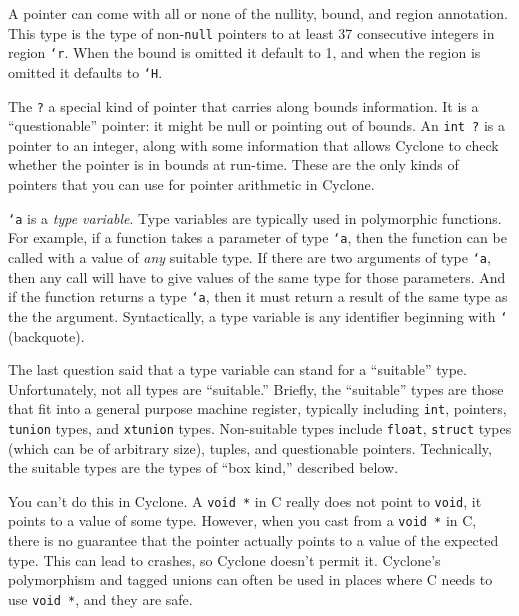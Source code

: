 
A pointer can come with all or none of the nullity, bound, and region
annotation.  This type is the type of non-\texttt{null} pointers to
at least 37 consecutive integers in region \texttt{`r}.  When the
bound is omitted it default to 1, and when the region is omitted
it defaults to \texttt{`H}.


The \texttt{?} a special kind of pointer that carries along bounds
information.  It is a ``questionable'' pointer: it might be null or
pointing out of bounds.  An \texttt{int ?} is a pointer to an integer,
along with some information that allows Cyclone to check whether the
pointer is in bounds at run-time.  These are the only kinds of
pointers that you can use for pointer arithmetic in Cyclone.


\texttt{`a} is a \emph{type variable}.  Type variables are typically
used in polymorphic functions.  For example, if a function takes a
parameter of type \texttt{`a}, then the function can be called with a
value of \emph{any} suitable type.  If there are two arguments of type
\texttt{`a}, then any call will have to give values of the same type
for those parameters.  And if the function returns a type \texttt{`a},
then it must return a result of the same type as the the argument.
Syntactically, a type variable is any identifier beginning with
\texttt{`} (backquote).


The last question said that a type variable can stand for a
``suitable'' type.  Unfortunately, not all types are ``suitable.''
Briefly, the ``suitable'' types are those that fit into a general
purpose machine register, typically including \texttt{int}, pointers,
\texttt{tunion} types, and \texttt{xtunion} types.  Non-suitable types
include \texttt{float}, \texttt{struct} types (which can be of
arbitrary size), tuples, and questionable pointers.
Technically, the suitable types are the types of ``box kind,''
described below.


You can't do this in Cyclone.  A \texttt{void *} in C really does not
point to \texttt{void}, it points to a value of some type.  However,
when you cast from a \texttt{void *} in C, there is no guarantee that
the pointer actually points to a value of the expected type.  This can
lead to crashes, so Cyclone doesn't permit it.  Cyclone's
polymorphism and tagged unions can often be used in places where C
needs to use \texttt{void *}, and they are safe.

